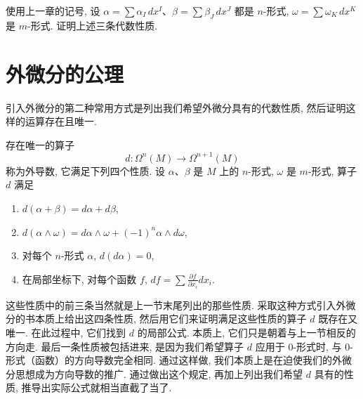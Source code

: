 \begin{question}\label{q:4-3}
使用上一章的记号, 设 $\alpha=\sum \alpha_I\,dx^I$、$\beta=\sum \beta_J\,dx^J$ 都是 $n$-形式, $\omega=\sum \omega_K\,dx^K$ 是 $m$-形式. 证明上述三条代数性质.
\end{question}

\section{外微分的公理}

引入外微分的第二种常用方式是列出我们希望外微分具有的代数性质, 然后证明这样的运算存在且唯一.

\begin{theorem}[外微分算子的存在唯一性]\label{thm:4-1}
存在唯一的算子
\[
d:\Omega^n(M)\to\Omega^{n+1}(M)
\]
称为外导数, 它满足下列四个性质. 设 $\alpha$、$\beta$ 是 $M$ 上的 $n$-形式, $\omega$ 是 $m$-形式, 算子 $d$ 满足
\begin{enumerate}
  \item $d(\alpha+\beta)=d\alpha+d\beta$, 
  \item $d(\alpha\wedge\omega)=d\alpha\wedge\omega+(-1)^n\alpha\wedge d\omega$, 
  \item 对每个 $n$-形式 $\alpha$, $d(d\alpha)=0$, 
  \item 在局部坐标下, 对每个函数 $f$, $df=\sum\frac{\partial f}{\partial x_i}dx_i$.
\end{enumerate}
\end{theorem}

这些性质中的前三条当然就是上一节末尾列出的那些性质. 采取这种方式引入外微分的书本质上给出这四条性质, 然后用它们来证明满足这些性质的算子 $d$ 既存在又唯一. 在此过程中, 它们找到 $d$ 的局部公式. 本质上, 它们只是朝着与上一节相反的方向走. 最后一条性质被包括进来, 是因为我们希望算子 $d$ 应用于 0-形式时, 与 0-形式（函数）的方向导数完全相同. 通过这样做, 我们本质上是在迫使我们的外微分思想成为方向导数的推广. 通过做出这个规定, 再加上列出我们希望 $d$ 具有的性质, 推导出实际公式就相当直截了当了.


